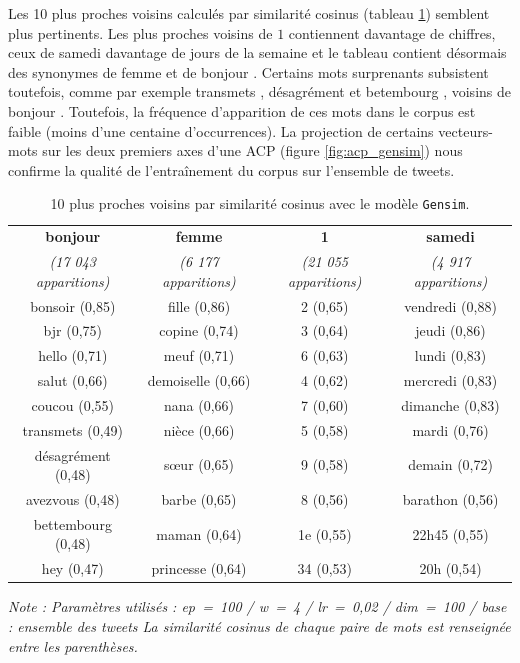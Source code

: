 \documentclass[11pt,french,french]{article}
\begin{document}
Les 10 plus proches voisins calculés par similarité cosinus (tableau \ref{table:knn_gensim}) semblent plus pertinents.
Les plus proches voisins de \og \(1\) \fg contiennent davantage de chiffres, ceux de \og samedi \fg davantage de jours de la semaine et le tableau contient désormais des synonymes de \og femme \fg et de \og bonjour \fg.
Certains mots surprenants subsistent toutefois, comme par exemple \og transmets \fg{}, \og désagrément \fg{} et \og betembourg \fg{}, voisins de \og bonjour \fg{}.
Toutefois, la fréquence d'apparition de ces mots dans le corpus est faible (moins d'une centaine d'occurrences).
La projection de certains vecteurs-mots sur les deux premiers axes d'une ACP (figure \ref{fig:acp_gensim}) nous confirme la qualité de l'entraînement du corpus sur l'ensemble de tweets.

\begin{table}[h]
\begin{center}
\begin{tabular}{|c|c|c|c|}
    \hline
\textbf{bonjour} & \textbf{femme} & \textbf{1} & \textbf{samedi} \tabularnewline
\emph{(17 043 apparitions)} & \emph{(6 177 apparitions)} & \emph{(21 055 apparitions)} & \emph{(4 917 apparitions)} \tabularnewline
       \hline
bonsoir (0,85) & fille (0,86) & 2 (0,65) & vendredi (0,88) \tabularnewline
bjr (0,75) & copine (0,74) & 3 (0,64) & jeudi (0,86) \tabularnewline
hello (0,71) & meuf (0,71) & 6 (0,63) & lundi (0,83) \tabularnewline
salut (0,66) & demoiselle (0,66) & 4 (0,62) & mercredi (0,83) \tabularnewline
coucou (0,55) & nana (0,66) & 7 (0,60) & dimanche (0,83) \tabularnewline
transmets (0,49) & nièce (0,66) & 5 (0,58) & mardi (0,76) \tabularnewline
désagrément (0,48) & sœur (0,65) & 9 (0,58) & demain (0,72) \tabularnewline
avezvous (0,48) & barbe (0,65) & 8 (0,56) & barathon (0,56) \tabularnewline
bettembourg (0,48) & maman (0,64) & 1e (0,55) & 22h45 (0,55) \tabularnewline
hey (0,47) & princesse (0,64) & 34 (0,53) & 20h (0,54) \tabularnewline
    \hline
 \end{tabular}
\captionsetup{margin=0cm,format=hang,justification=justified}
\caption{10 plus proches voisins par similarité cosinus avec le modèle \texttt{Gensim}.}\label{table:knn_gensim}
\end{center}
\vspace{-0.3cm}
\footnotesize
\emph{Note : Paramètres utilisés : ep = 100 / w = 4 / lr = 0,02 / dim = 100 / base : ensemble des tweets\newline
La similarité cosinus de chaque paire de mots est renseignée entre les parenthèses.}
\end{table}
\end{document}
